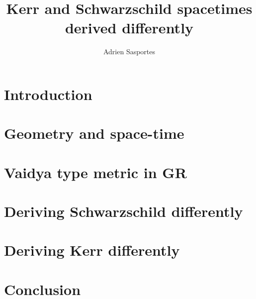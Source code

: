 \documentclass[a4paper,12pt]{article}
\title{Kerr and Schwarzschild spacetimes derived differently}
\author{Adrien Sasportes}
\begin{document}
    \maketitle
    \section{Introduction}
    \section{Geometry and space-time}
    \section{Vaidya type metric in GR}
    \section{Deriving Schwarzschild differently}
    \section{Deriving Kerr differently}
    \section{Conclusion}
\end{document}

